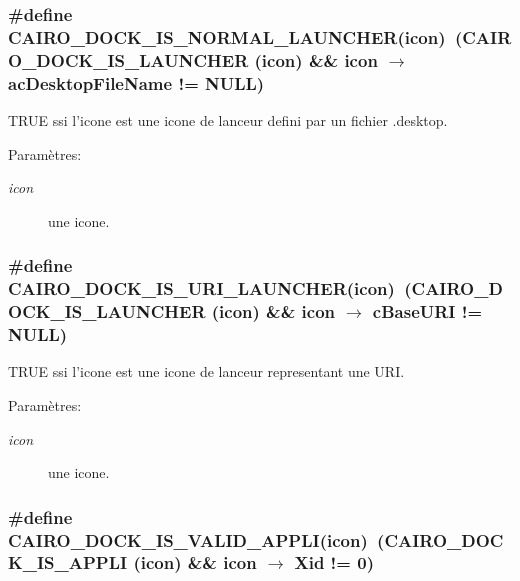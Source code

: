 \subsubsection{\setlength{\rightskip}{0pt plus 5cm}\#define CAIRO\_\-DOCK\_\-IS\_\-NORMAL\_\-LAUNCHER(icon)~(CAIRO\_\-DOCK\_\-IS\_\-LAUNCHER (icon) \&\& icon $\rightarrow$ acDesktopFileName != NULL)}\label{cairo-dock-icons_8h_f44e2138fd7058738ee48e5aaff1f403}


TRUE ssi l'icone est une icone de lanceur defini par un fichier .desktop. \begin{Desc}
\item[Paramètres:]
\begin{description}
\item[{\em icon}]une icone. \end{description}
\end{Desc}
\subsubsection{\setlength{\rightskip}{0pt plus 5cm}\#define CAIRO\_\-DOCK\_\-IS\_\-URI\_\-LAUNCHER(icon)~(CAIRO\_\-DOCK\_\-IS\_\-LAUNCHER (icon) \&\& icon $\rightarrow$ cBaseURI != NULL)}\label{cairo-dock-icons_8h_14acecf1e96723ddcb10ac01f5bb8174}


TRUE ssi l'icone est une icone de lanceur representant une URI. \begin{Desc}
\item[Paramètres:]
\begin{description}
\item[{\em icon}]une icone. \end{description}
\end{Desc}
\subsubsection{\setlength{\rightskip}{0pt plus 5cm}\#define CAIRO\_\-DOCK\_\-IS\_\-VALID\_\-APPLI(icon)~(CAIRO\_\-DOCK\_\-IS\_\-APPLI (icon) \&\& icon $\rightarrow$ Xid != 0)}\label{cairo-dock-icons_8h_3ebe5a19b6451069d6063a8b538536f4}


